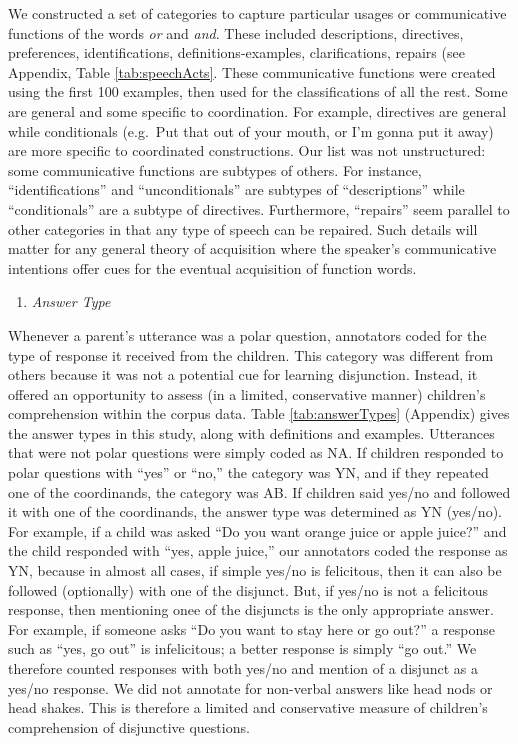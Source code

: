 \documentclass[
  english,
  ,man,floatsintext]{apa6}
\providecommand{\tightlist}{%
  \setlength{\itemsep}{0pt}\setlength{\parskip}{0pt}}
\begin{document}
We constructed a set of categories to capture particular usages or communicative functions of the words \emph{or} and \emph{and}. These included descriptions, directives, preferences, identifications, definitions-examples, clarifications, repairs (see Appendix, Table \ref{tab:speechActs}. These communicative functions were created using the first 100 examples, then used for the classifications of all the rest. Some are general and some specific to coordination. For example, directives are general while conditionals (e.g.~Put that out of your mouth, or I'm gonna put it away) are more specific to coordinated constructions. Our list was not unstructured: some communicative functions are subtypes of others. For instance, ``identifications'' and ``unconditionals'' are subtypes of ``descriptions'' while ``conditionals'' are a subtype of directives. Furthermore, ``repairs'' seem parallel to other categories in that any type of speech can be repaired. Such details will matter for any general theory of acquisition where the speaker's communicative intentions offer cues for the eventual acquisition of function words.

\begin{enumerate}
\def\labelenumi{\arabic{enumi}.}
\setcounter{enumi}{6}
\tightlist
\item
  \emph{Answer Type}
\end{enumerate}

Whenever a parent's utterance was a polar question, annotators coded for the type of response it received from the children. This category was different from others because it was not a potential cue for learning disjunction. Instead, it offered an opportunity to assess (in a limited, conservative manner) children's comprehension within the corpus data. Table \ref{tab:answerTypes} (Appendix) gives the answer types in this study, along with definitions and examples. Utterances that were not polar questions were simply coded as NA. If children responded to polar questions with ``yes'' or ``no,'' the category was YN, and if they repeated one of the coordinands, the category was AB. If children said yes/no and followed it with one of the coordinands, the answer type was determined as YN (yes/no). For example, if a child was asked ``Do you want orange juice or apple juice?'' and the child responded with ``yes, apple juice,'' our annotators coded the response as YN, because in almost all cases, if simple yes/no is felicitous, then it can also be followed (optionally) with one of the disjunct. But, if yes/no is not a felicitous response, then mentioning onee of the disjuncts is the only appropriate answer. For example, if someone asks ``Do you want to stay here or go out?'' a response such as ``yes, go out'' is infelicitous; a better response is simply ``go out.'' We therefore counted responses with both yes/no and mention of a disjunct as a yes/no response. We did not annotate for non-verbal answers like head nods or head shakes. This is therefore a limited and conservative measure of children's comprehension of disjunctive questions.
\end{document}
